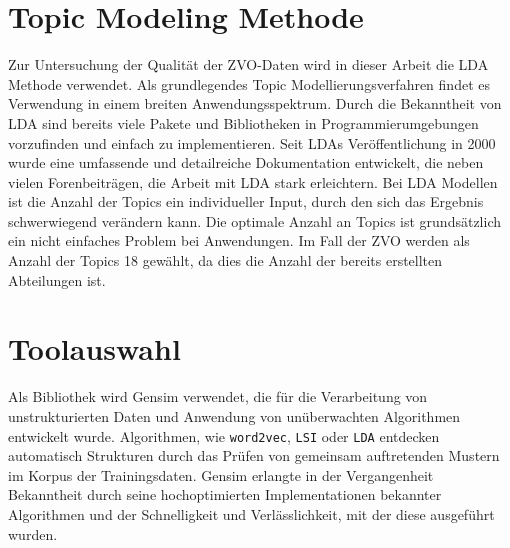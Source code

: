 \documentclass[german,version-2020-11]{uzl-thesis}
\begin{document}
\section{Topic Modeling Methode}
Zur Untersuchung der Qualität der ZVO-Daten wird in dieser Arbeit die LDA Methode verwendet. Als grundlegendes Topic Modellierungsverfahren findet es Verwendung in einem breiten Anwendungsspektrum. Durch die Bekanntheit von LDA sind bereits viele Pakete und Bibliotheken in Programmierumgebungen vorzufinden und einfach zu implementieren. Seit LDAs Veröffentlichung in 2000 wurde eine umfassende und detailreiche Dokumentation entwickelt, die neben vielen Forenbeiträgen, die Arbeit mit LDA stark erleichtern. Bei LDA Modellen ist die Anzahl der Topics ein individueller Input, durch den sich das Ergebnis schwerwiegend verändern kann. Die optimale Anzahl an Topics ist grundsätzlich ein nicht einfaches Problem bei Anwendungen. Im Fall der ZVO werden als Anzahl der Topics 18  gewählt, da dies die Anzahl der bereits erstellten Abteilungen ist. 

\section{Toolauswahl}
Als Bibliothek wird Gensim verwendet, die für die Verarbeitung von unstrukturierten Daten und Anwendung von unüberwachten Algorithmen entwickelt wurde. Algorithmen, wie \lstinline{word2vec}, \lstinline{LSI} oder \lstinline{LDA} entdecken automatisch Strukturen durch das Prüfen von gemeinsam auftretenden Mustern im Korpus der Trainingsdaten. Gensim erlangte in der Vergangenheit Bekanntheit durch seine hochoptimierten Implementationen bekannter Algorithmen und der Schnelligkeit und Verlässlichkeit, mit der diese ausgeführt wurden.
\end{document}
